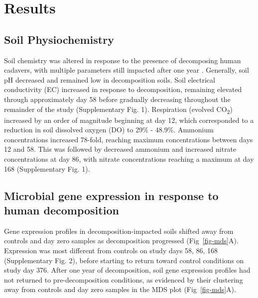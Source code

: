 \documentclass[
  sn-nature,
  lineno, referee]{sn-jnl}
\begin{document}
\section{Results}\label{results}

\subsection{Soil Physiochemistry}\label{soil-physiochemistry}

Soil chemistry was altered in response to the presence of decomposing
human cadavers, with multiple parameters still impacted after one year
\citep{taylor_transient_2024}. Generally, soil pH decreased and remained
low in decomposition soils. Soil electrical conductivity (EC) increased
in response to decomposition, remaining elevated through approximately
day 58 before gradually decreasing throughout the remainder of the study
(Supplementary Fig. 1). Respiration (evolved CO\textsubscript{2})
increased by an order of magnitude beginning at day 12, which
corresponded to a reduction in soil dissolved oxygen (DO) to 29\% -
48.9\%. Ammonium concentrations increased 78-fold, reaching maximum
concentrations between days 12 and 58. This was followed by decreased
ammonium and increased nitrate concentrations at day 86, with nitrate
concentrations reaching a maximum at day 168 (Supplementary Fig. 1).

\subsection{Microbial gene expression in response to human
decomposition}\label{microbial-gene-expression-in-response-to-human-decomposition}

Gene expression profiles in decomposition-impacted soils shifted away
from controls and day zero samples as decomposition progressed
(Fig~\ref{fig-mds}A). Expression was most different from controls on
study days 58, 86, 168 (Supplementary Fig. 2), before starting to return
toward control conditions on study day 376. After one year of
decomposition, soil gene expression profiles had not returned to
pre-decomposition conditions, as evidenced by their clustering away from
controls and day zero samples in the MDS plot (Fig~\ref{fig-mds}A).
\end{document}

